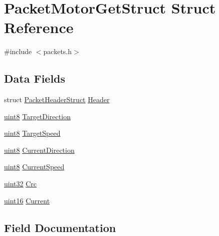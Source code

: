 \hypertarget{struct_packet_motor_get_struct}{}\section{Packet\+Motor\+Get\+Struct Struct Reference}
\label{struct_packet_motor_get_struct}


{\ttfamily \#include $<$packets.\+h$>$}

\subsection*{Data Fields}
\begin{DoxyCompactItemize}
\item 
struct \hyperlink{struct_packet_header_struct}{Packet\+Header\+Struct} \hyperlink{struct_packet_motor_get_struct_ab201af50281aff5ed4f984f994938007}{Header}
\item 
\hyperlink{_h_y_d_r_a_s_8_x_2types_8h_a33a5e996e7a90acefb8b1c0bea47e365}{uint8} \hyperlink{struct_packet_motor_get_struct_a447585795e8671c8d58ff41eb83e3fa9}{Target\+Direction}
\item 
\hyperlink{_h_y_d_r_a_s_8_x_2types_8h_a33a5e996e7a90acefb8b1c0bea47e365}{uint8} \hyperlink{struct_packet_motor_get_struct_a2aecc325c2f29b441f8a564a5d6db18f}{Target\+Speed}
\item 
\hyperlink{_h_y_d_r_a_s_8_x_2types_8h_a33a5e996e7a90acefb8b1c0bea47e365}{uint8} \hyperlink{struct_packet_motor_get_struct_a827bc3a49e45a6a9c62e6f3f77ca5aa7}{Current\+Direction}
\item 
\hyperlink{_h_y_d_r_a_s_8_x_2types_8h_a33a5e996e7a90acefb8b1c0bea47e365}{uint8} \hyperlink{struct_packet_motor_get_struct_a971c61a0b5b565b29c63a6cbfcd1ed42}{Current\+Speed}
\item 
\hyperlink{_h_y_d_r_a_s_8_x_2types_8h_acbd4acd0d29e2d6c43104827f77d9cd2}{uint32} \hyperlink{struct_packet_motor_get_struct_a1aaa4998291cff4c19ca5cca4b1e9489}{Crc}
\item 
\hyperlink{_h_y_d_r_a_s_8_x_2types_8h_ac2a9e79eb120216f855626495b7bd18a}{uint16} \hyperlink{struct_packet_motor_get_struct_ace27e048112fedacb5b3b2e1842476d5}{Current}
\end{DoxyCompactItemize}


\subsection{Field Documentation}
\hypertarget{struct_packet_motor_get_struct_a1aaa4998291cff4c19ca5cca4b1e9489}{}
